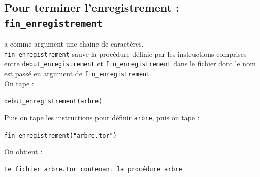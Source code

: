 \documentclass[a4paper,11pt]{book}
\begin{document}
\subsection{Pour terminer l'enregistrement : {\tt fin\_enregistrement}}
 a comme argument une chaine de caract\`eres.\\
{\tt fin\_enregistrement} sauve la proc\'edure d\'efinie par les instructions 
comprises entre {\tt debut\_enregistrement} et {\tt fin\_enregistrement}
dans le fichier dont le nom est pass\'e en argument de {\tt fin\_enregistrement}.\\
On tape :
\begin{center}{\tt debut\_enregistrement(arbre)}\end{center}
Puis on tape les instructions pour d\'efinir {\tt arbre}, puis on tape :
\begin{center}{\tt fin\_enregistrement("arbre.tor")}\end{center}
On obtient :
\begin{center}{\tt Le fichier arbre.tor contenant la proc\'edure arbre}\end{center}
\end{document}
